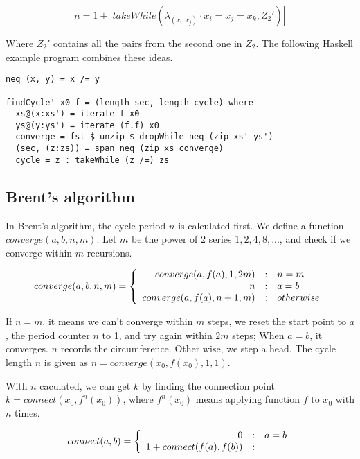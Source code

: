 \documentclass{article}
\begin{document}
\begin{equation}
n = 1 + |takeWhile(\lambda_{(x_i, x_j)} \cdot x_i = x_j = x_k, Z_2')|
\end{equation}

Where $Z_2'$ contains all the pairs from the second one in $Z_2$. The following Haskell example program
combines these ideas.

\lstset{language=Haskell}
\begin{lstlisting}
neq (x, y) = x /= y

findCycle' x0 f = (length sec, length cycle) where
  xs@(x:xs') = iterate f x0
  ys@(y:ys') = iterate (f.f) x0
  converge = fst $ unzip $ dropWhile neq (zip xs' ys')
  (sec, (z:zs)) = span neq (zip xs converge)
  cycle = z : takeWhile (z /=) zs
\end{lstlisting}

\subsection{Brent's algorithm}
In Brent's algorithm, the cycle period $n$ is calculated first. We define a function $converge(a, b, n, m)$.
Let $m$ be the power of 2 series $1, 2, 4, 8, ...$, and check if we converge within $m$ recursions.

\begin{equation}
converge(a, b, n, m) = \left \{
  \begin{array}
  {r@{\quad:\quad}l}
  converge(a, f(a), 1, 2m) & n = m \\
  n & a = b \\
  converge(a, f(a), n+1, m) & otherwise
  \end{array}
\right.
\end{equation}

If $n=m$, it means we can't converge within $m$ steps, we reset the start point to $a$, the period counter
$n$ to 1, and try again within $2m$ steps; When $a = b$, it converges. $n$ records the circumference. Other
wise, we step a head. The cycle length $n$ is given as $n = converge(x_0, f(x_0), 1, 1)$.

With $n$ caculated, we can get $k$ by finding the connection point $k = connect(x_0, f^n(x_0))$, where
$f^n(x_0)$ means applying function $f$ to $x_0$ with $n$ times.

\begin{equation}
connect(a, b) = \left \{
  \begin{array}
  {r@{\quad:\quad}l}
  0 & a = b \\
  1 + connect(f(a), f(b))
  \end{array}
\right.
\end{equation}
\end{document}
